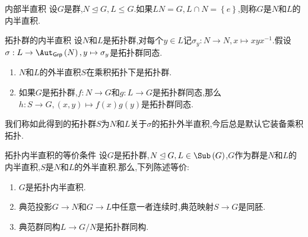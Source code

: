 \begin{definition}{内部半直积}{}
	设$G$是群,$N\unlhd G,L\leq G$.如果$LN=G,L\cap N=\left\{e\right\}$,则称$G$是$N$和$L$的内半直积.
\end{definition}

\begin{proposition}{拓扑群的内半直积}{}
	设$N$和$L$是拓扑群,对每个$y\in L$记$\sigma_{y}:N\to N,x\mapsto xyx^{-1}$.假设$\sigma:L\to\Aut_{\mathsf{Grp}}\left(N\right),y\mapsto\sigma_{y}$是拓扑群同态.
	\begin{enumerate}
		\item $N$和$L$的外半直积$S$在乘积拓扑下是拓扑群.
		\item 如果$G$是拓扑群,$f:N\to G$和$g:L\to G$是拓扑群同态,那么$h:S\to G,\left(x,y\right)\mapsto f\left(x\right)g\left(y\right)$是拓扑群同态.
	\end{enumerate}
\end{proposition}

\begin{convention}{}{}
	我们称如此得到的拓扑群$S$为$N$和$L$关于$\sigma$的拓扑外半直积,今后总是默认它装备乘积拓扑.
\end{convention}

\begin{proposition}{拓扑内半直积的等价条件}{}
	设$G$是拓扑群,$N\unlhd G,L\in\Sub\left(G\right)$,$G$作为群是$N$和$L$的内半直积,$S$是$N$和$L$的外半直积.那么,下列陈述等价:
	\begin{enumerate}
		\item $G$是拓扑内半直积.
		\item 典范投影$G\to N$和$G\to L$中任意一者连续时,典范映射$S\to G$是同胚.
		\item 典范群同构$L\to G/N$是拓扑群同构.
	\end{enumerate}
\end{proposition}

























